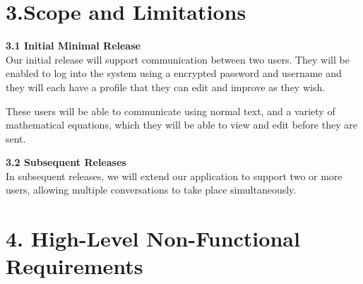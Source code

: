 \documentclass[29pt,a4paper]{moderncv}
\begin{document}
	
	\section*{\textbf{3.Scope and Limitations}}
	\vspace{4mm}

		\noindent \textbf{3.1 Initial Minimal Release}
		\vspace{4mm}
			\\Our initial release will support communication between two users.  They will be enabled to log into the system using a encrypted password and username and they will each have a profile that they can edit and improve as they wish.  
			
			These users will be able to communicate using normal text, and a variety of mathematical equations, which they will be able to view and edit before they are sent.
		\vspace{5mm}
		
		\noindent \textbf{3.2 Subsequent Releases}
		\vspace{4mm}
			\\In subsequent releases, we will extend our application to support two or more users, allowing multiple conversations to take place simultaneously.
		\vspace{5mm}

	\vspace{5mm}	
	
	\section*{\textbf{4. High-Level Non-Functional Requirements}}
	\vspace{4mm}
	
\end{document}
